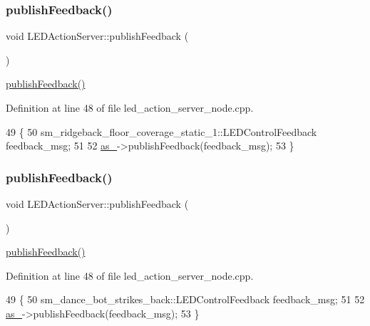 \subsubsection{\texorpdfstring{publish\+Feedback()}{publishFeedback()}\hspace{0.1cm}{\footnotesize\ttfamily [1/5]}}
{\footnotesize\ttfamily void L\+E\+D\+Action\+Server\+::publish\+Feedback (\begin{DoxyParamCaption}{ }\end{DoxyParamCaption})\hspace{0.3cm}{\ttfamily [inline]}}

\hyperlink{classLEDActionServer_a25c93d4e7ecdacbb4f5b090d7789aa36}{publish\+Feedback()} 

Definition at line 48 of file led\+\_\+action\+\_\+server\+\_\+node.\+cpp.


\begin{DoxyCode}
49 \{
50     sm\_ridgeback\_floor\_coverage\_static\_1::LEDControlFeedback feedback\_msg;
51     
52     \hyperlink{classLEDActionServer_a61d21c77642081acf017d4ebd65b2de0}{as\_}->publishFeedback(feedback\_msg);
53 \}
\end{DoxyCode}
\mbox{\label{classLEDActionServer_a25c93d4e7ecdacbb4f5b090d7789aa36}} 
\subsubsection{\texorpdfstring{publish\+Feedback()}{publishFeedback()}\hspace{0.1cm}{\footnotesize\ttfamily [2/5]}}
{\footnotesize\ttfamily void L\+E\+D\+Action\+Server\+::publish\+Feedback (\begin{DoxyParamCaption}{ }\end{DoxyParamCaption})\hspace{0.3cm}{\ttfamily [inline]}}

\hyperlink{classLEDActionServer_a25c93d4e7ecdacbb4f5b090d7789aa36}{publish\+Feedback()} 

Definition at line 48 of file led\+\_\+action\+\_\+server\+\_\+node.\+cpp.


\begin{DoxyCode}
49 \{
50     sm\_dance\_bot\_strikes\_back::LEDControlFeedback feedback\_msg;
51     
52     \hyperlink{classLEDActionServer_a61d21c77642081acf017d4ebd65b2de0}{as\_}->publishFeedback(feedback\_msg);
53 \}
\end{DoxyCode}
\mbox{\label{classLEDActionServer_a25c93d4e7ecdacbb4f5b090d7789aa36}} 
